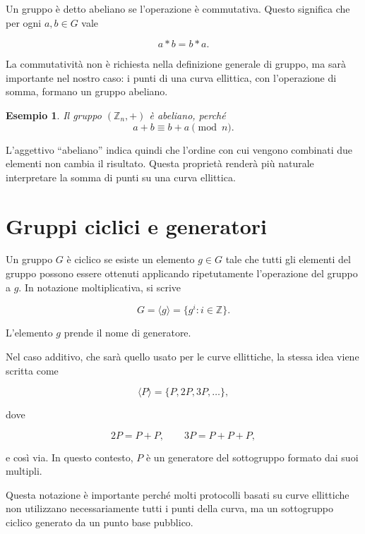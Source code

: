 \documentclass[12pt,a4paper,oneside]{report}
\newtheorem{example}{Esempio}[chapter]
\begin{document}
Un gruppo è detto abeliano se l'operazione è commutativa. Questo significa che per ogni \(a,b \in G\) vale

\begin{equation}
    a \ast b = b \ast a.
\end{equation}

La commutatività non è richiesta nella definizione generale di gruppo, ma sarà importante nel nostro caso: i punti di una curva ellittica, con l'operazione di somma, formano un gruppo abeliano.

\begin{example}
Il gruppo \((\mathbb{Z}_n,+)\) è abeliano, perché
\[
a+b \equiv b+a \pmod n.
\]
\end{example}

L'aggettivo ``abeliano'' indica quindi che l'ordine con cui vengono combinati due elementi non cambia il risultato. Questa proprietà renderà più naturale interpretare la somma di punti su una curva ellittica.

\section{Gruppi ciclici e generatori}

Un gruppo \(G\) è ciclico se esiste un elemento \(g \in G\) tale che tutti gli elementi del gruppo possono essere ottenuti applicando ripetutamente l'operazione del gruppo a \(g\). In notazione moltiplicativa, si scrive

\begin{equation}
    G = \langle g \rangle = \{g^i : i \in \mathbb{Z}\}.
\end{equation}

L'elemento \(g\) prende il nome di generatore.

Nel caso additivo, che sarà quello usato per le curve ellittiche, la stessa idea viene scritta come

\begin{equation}
    \langle P \rangle = \{P,2P,3P,\ldots\},
\end{equation}

dove

\[
2P = P+P, \qquad 3P = P+P+P,
\]

e così via. In questo contesto, \(P\) è un generatore del sottogruppo formato dai suoi multipli.

Questa notazione è importante perché molti protocolli basati su curve ellittiche non utilizzano necessariamente tutti i punti della curva, ma un sottogruppo ciclico generato da un punto base pubblico.
\end{document}
